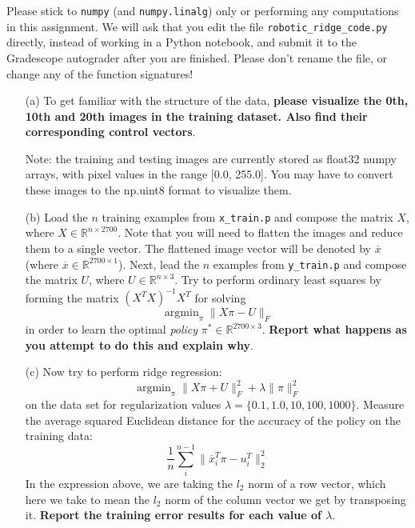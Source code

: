 \documentclass{article}
\begin{document}
Please stick to \texttt{numpy} (and \texttt{numpy.linalg}) only or performing any computations in this assignment. We will ask that you edit the file \texttt{robotic_ridge_code.py} directly, instead of working in a Python notebook, and submit it to the Gradescope autograder after you are finished. Please don't rename the file, or change any of the function signatures!
    \begin{itemize}
        \item [(a)] To get familiar with the structure of the data, \textbf{please visualize the 0th, 10th and 20th images in the training dataset. Also find their corresponding control vectors}.

        Note: the training and testing images are currently stored as float32 numpy arrays, with pixel values in the range [0.0, 255.0]. You may have to convert these images to the np.uint8 format to visualize them.

        \item [(b)] Load the $n$ training examples from \texttt{x_train.p} and compose the matrix $X$, where $X \in \mathbb{R}^{n \times 2700}$. Note that you will need to flatten the images and reduce them to a single vector. The flattened image vector will be denoted by $\overline{x}$ (where $\overline{x} \in \mathbb{R}^{2700 \times 1}$). Next, lead the $n$ examples from \texttt{y_train.p} and compose the matrix $U$, where $U \in \mathbb{R}^{n \times 3}$. Try to perform ordinary least squares by forming the matrix $(X^{T}X)^{-1}X^{T}$ for solving
            \begin{equation*}
                \mathop{argmin}_{\pi}\lVert X\pi - U \rVert_{F}
            \end{equation*}
        in order to learn the optimal \textit{policy} $\pi^{*} \in \mathbb{R}^{2700 \times 3}$. \textbf{Report what happens as you attempt to do this and explain why}.

        \item [(c)] Now try to perform ridge regression:
            \begin{equation*}
                \mathop{argmin}_{\pi} \lVert X \pi + U \rVert_{F}^{2} + \lambda \lVert \pi \rVert^{2}_{F}
            \end{equation*}
        on the data set for regularization values $\lambda = \{0.1, 1.0, 10, 100, 1000\}$. Measure the average squared Euclidean distance for the accuracy of the policy on the training data:
            \begin{equation*}
                \dfrac{1}{n}\sum_{i}^{n-1} \lVert \overline{x}_{i}^{T}\pi - u_{i}^{T} \rVert^{2}_{2}
            \end{equation*}
        In the expression above, we are taking the $l_{2}$ norm of a row vector, which here we take to mean the $l_{2}$ norm of the column vector we get by transposing it. \textbf{Report the training error results for each value of $\lambda$}.


\end{itemize}
\end{document}
